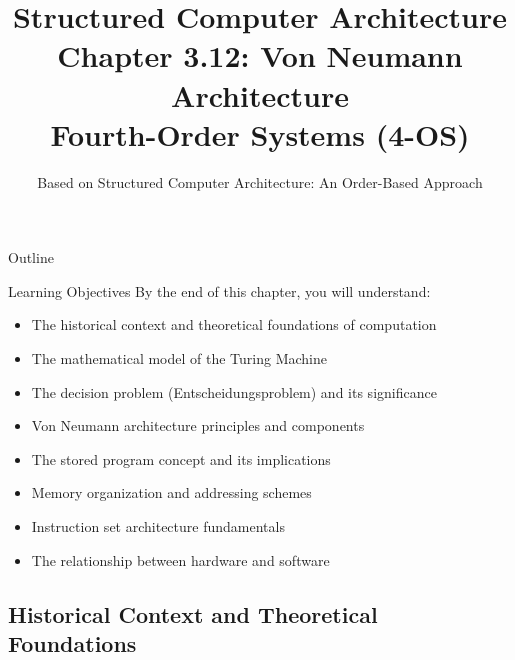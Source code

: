 \documentclass[aspectratio=169]{beamer}
\title[Chapter 3.12: Von Neumann Architecture]{Structured Computer Architecture\\Chapter 3.12: Von Neumann Architecture\\Fourth-Order Systems (4-OS)}
\author{Based on Structured Computer Architecture: An Order-Based Approach}
\date{}
\begin{document}
\begin{frame}
\titlepage
\end{frame}

\begin{frame}{Outline}
\tableofcontents
\end{frame}

\begin{frame}{Learning Objectives}
By the end of this chapter, you will understand:
\begin{itemize}
\item The historical context and theoretical foundations of computation
\item The mathematical model of the Turing Machine
\item The decision problem (Entscheidungsproblem) and its significance
\item Von Neumann architecture principles and components
\item The stored program concept and its implications
\item Memory organization and addressing schemes
\item Instruction set architecture fundamentals
\item The relationship between hardware and software
\end{itemize}
\end{frame}

\subsection{Historical Context and Theoretical Foundations}
\end{document}
